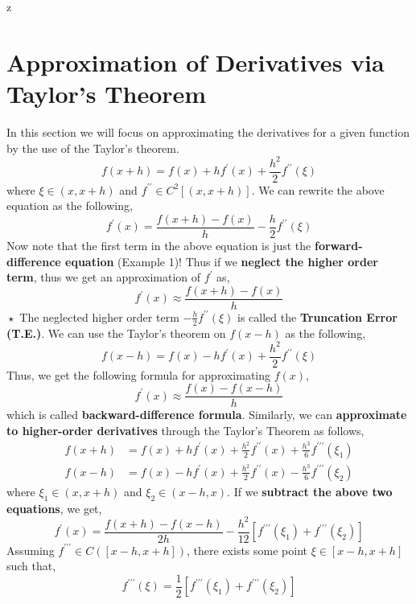 z\documentclass[a4paper,12pt,twoside]{book}
\newcommand{\nll}[0]{\newline\newline}
\begin{document}
\section{Approximation of Derivatives via Taylor's Theorem}
In this section we will focus on approximating the derivatives for a given function by the use of the Taylor's theorem.
\[f(x+h) = f(x) + hf^\prime(x) + \frac{h^2}{2}f^{\prime\prime}(\xi)\]
where $\xi \in (x,x+h)$ and $f^{\prime\prime} \in C^2[(x,x+h)]$.
We can rewrite the above equation as the following,
\[f^\prime(x) = \frac{f(x+h) - f(x)}{h} - \frac{h}{2}f^{\prime\prime}(\xi)\]
Now note that the first term in the above equation is just the \textbf{forward-difference equation} (Example 1)! Thus if we \textbf{neglect the higher order term}, thus we get an approximation of $f^\prime$ as,
\begin{equation}
    f^\prime(x) \approx \frac{f(x+h) - f(x)}{h}
\end{equation}
$\boxed{\star}$ The neglected higher order term $-\frac{h}{2}f^{\prime\prime}(\xi)$ is called the \textbf{Truncation Error (T.E.)}.
\nll
We can use the Taylor's theorem on $f(x-h)$ as the following,
\[f(x-h) = f(x) - hf^\prime(x) + \frac{h^2}{2}f^{\prime\prime}(\xi)\]
Thus, we get the following formula for approximating $f(x)$,
\begin{equation}
    f^\prime(x) \approx \frac{f(x) - f(x-h)}{h}
\end{equation}
which is called \textbf{backward-difference formula}.
\nll
Similarly, we can \textbf{approximate to higher-order derivatives} through the Taylor's Theorem as follows,
\begin{equation}
\begin{split}
    f(x+h) &= f(x) + hf^\prime(x) + \frac{h^2}{2}f^{\prime\prime}(x) + \frac{h^3}{6}f^{\prime\prime\prime}(\xi_1)\\
    f(x-h) &= f(x) - hf^\prime(x) + \frac{h^2}{2}f^{\prime\prime}(x) - \frac{h^3}{6}f^{\prime\prime\prime}(\xi_2)
\end{split}
\end{equation}
where $\xi_1 \in (x,x+h)$ and $\xi_2 \in (x-h,x)$. If we \textbf{subtract the above two equations}, we get,
\begin{equation}
    f^\prime(x) = \frac{f(x+h)-f(x-h)}{2h} - \frac{h^2}{12}[f^{\prime\prime\prime}(\xi_1) + f^{\prime\prime\prime}(\xi_2)]
\end{equation}
Assuming $f^{\prime\prime\prime} \in C([x-h,x+h])$, there exists some point $\xi \in [x-h,x+h]$ such that,
\[f^{\prime\prime\prime}(\xi) = \frac{1}{2}[f^{\prime\prime\prime}(\xi_1) + f^{\prime\prime\prime}(\xi_2)]\]
\end{document}
